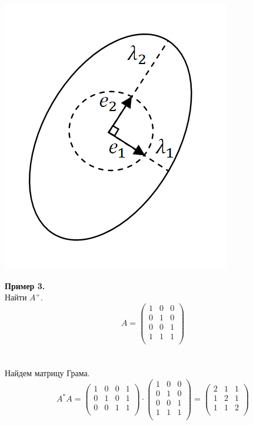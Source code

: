 \documentclass[12pt]{article}
\theoremstyle{definition}
\numberwithin{equation}{section}
\begin{document}
\begin{center} \includegraphics[scale=0.5]{l1_2}\end{center}
\textbf{Пример 3.}\\
Найти $A^+$.\\
\[A = \begin{pmatrix}
1 & 0 & 0 \\         
0 & 1 & 0 \\
0 & 0 & 1 \\
1 & 1 & 1 \\
\end{pmatrix}\]\\
\\
Найдем матрицу Грама.\\
\[A^*A = \begin{pmatrix}
1 & 0 & 0 & 1 \\         
0 & 1 & 0 & 1\\
0 & 0 & 1 & 1\\
\end{pmatrix} \cdot \begin{pmatrix}
1 & 0 & 0 \\         
0 & 1 & 0 \\
0 & 0 & 1 \\
1 & 1 & 1 \\
\end{pmatrix} = \begin{pmatrix}
2 & 1 & 1 \\         
1 & 2 & 1 \\
1 & 1 & 2 \\
\end{pmatrix}\]\\
\end{document}

